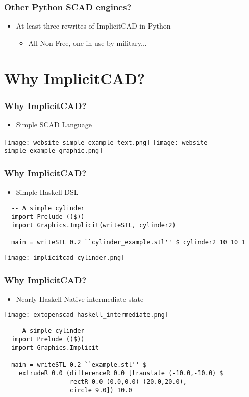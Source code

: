 \documentclass{beamer}
\begin{document}
\begin{frame}
\frametitle{Other Python SCAD engines?}
\begin{itemize}
\item At least three rewrites of ImplicitCAD in Python
\begin{itemize}
\item All Non-Free, one in use by military...
\end{itemize}
\end{itemize}
\end{frame}

\section{Why ImplicitCAD?}
\begin{frame}
  \frametitle{Why ImplicitCAD?}
\begin{itemize}
\item Simple SCAD Language
\end{itemize}
\texttt{[image: website-simple\_example\_text.png]}
\texttt{[image: website-simple\_example\_graphic.png]}
\end{frame}

\begin{frame}[fragile]
  \frametitle{Why ImplicitCAD?}
  \lstset{basicstyle=\ttfamily\scriptsize}
\begin{itemize}
\item Simple Haskell DSL
\end{itemize}
\begin{lstlisting}
  -- A simple cylinder
  import Prelude (($))
  import Graphics.Implicit(writeSTL, cylinder2)

  main = writeSTL 0.2 ``cylinder_example.stl'' $ cylinder2 10 10 1
\end{lstlisting}
    \texttt{[image: implicitcad-cylinder.png]}
\end{frame}

\begin{frame}[fragile]
  \frametitle{Why ImplicitCAD?}
\begin{itemize}
\item Nearly Haskell-Native intermediate state
\end{itemize}
\texttt{[image: extopenscad-haskell\_intermediate.png]}
\lstset{basicstyle=\ttfamily\scriptsize}
\begin{lstlisting}
  -- A simple cylinder
  import Prelude (($))
  import Graphics.Implicit

  main = writeSTL 0.2 ``example.stl'' $
    extrudeR 0.0 (differenceR 0.0 [translate (-10.0,-10.0) $
                  rectR 0.0 (0.0,0.0) (20.0,20.0),
                  circle 9.0]) 10.0
\end{lstlisting}
\end{frame}
\end{document}
